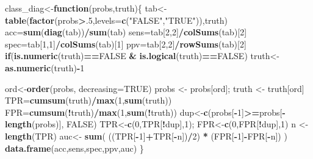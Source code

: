 \documentclass[]{article}
\newenvironment{Shaded}{\begin{snugshade}}{\end{snugshade}}
\newcommand{\ControlFlowTok}[1]{\textcolor[rgb]{0.13,0.29,0.53}{\textbf{#1}}}
\newcommand{\DataTypeTok}[1]{\textcolor[rgb]{0.13,0.29,0.53}{#1}}
\newcommand{\DecValTok}[1]{\textcolor[rgb]{0.00,0.00,0.81}{#1}}
\newcommand{\KeywordTok}[1]{\textcolor[rgb]{0.13,0.29,0.53}{\textbf{#1}}}
\newcommand{\NormalTok}[1]{#1}
\newcommand{\OperatorTok}[1]{\textcolor[rgb]{0.81,0.36,0.00}{\textbf{#1}}}
\newcommand{\OtherTok}[1]{\textcolor[rgb]{0.56,0.35,0.01}{#1}}
\newcommand{\StringTok}[1]{\textcolor[rgb]{0.31,0.60,0.02}{#1}}
\begin{document}
\begin{Shaded}
\begin{Highlighting}[]
\NormalTok{class_diag<-}\ControlFlowTok{function}\NormalTok{(probs,truth)\{}
\NormalTok{ tab<-}\KeywordTok{table}\NormalTok{(}\KeywordTok{factor}\NormalTok{(probs}\OperatorTok{>}\NormalTok{.}\DecValTok{5}\NormalTok{,}\DataTypeTok{levels=}\KeywordTok{c}\NormalTok{(}\StringTok{"FALSE"}\NormalTok{,}\StringTok{"TRUE"}\NormalTok{)),truth)}
\NormalTok{ acc=}\KeywordTok{sum}\NormalTok{(}\KeywordTok{diag}\NormalTok{(tab))}\OperatorTok{/}\KeywordTok{sum}\NormalTok{(tab)}
\NormalTok{ sens=tab[}\DecValTok{2}\NormalTok{,}\DecValTok{2}\NormalTok{]}\OperatorTok{/}\KeywordTok{colSums}\NormalTok{(tab)[}\DecValTok{2}\NormalTok{]}
\NormalTok{ spec=tab[}\DecValTok{1}\NormalTok{,}\DecValTok{1}\NormalTok{]}\OperatorTok{/}\KeywordTok{colSums}\NormalTok{(tab)[}\DecValTok{1}\NormalTok{]}
\NormalTok{ ppv=tab[}\DecValTok{2}\NormalTok{,}\DecValTok{2}\NormalTok{]}\OperatorTok{/}\KeywordTok{rowSums}\NormalTok{(tab)[}\DecValTok{2}\NormalTok{]}
 \ControlFlowTok{if}\NormalTok{(}\KeywordTok{is.numeric}\NormalTok{(truth)}\OperatorTok{==}\OtherTok{FALSE} \OperatorTok{&}\StringTok{ }\KeywordTok{is.logical}\NormalTok{(truth)}\OperatorTok{==}\OtherTok{FALSE}\NormalTok{) truth<-}\KeywordTok{as.numeric}\NormalTok{(truth)}\OperatorTok{-}\DecValTok{1}
 
\NormalTok{ ord<-}\KeywordTok{order}\NormalTok{(probs, }\DataTypeTok{decreasing=}\OtherTok{TRUE}\NormalTok{)}
\NormalTok{ probs <-}\StringTok{ }\NormalTok{probs[ord]; truth <-}\StringTok{ }\NormalTok{truth[ord]}
\NormalTok{ TPR=}\KeywordTok{cumsum}\NormalTok{(truth)}\OperatorTok{/}\KeywordTok{max}\NormalTok{(}\DecValTok{1}\NormalTok{,}\KeywordTok{sum}\NormalTok{(truth))}
\NormalTok{ FPR=}\KeywordTok{cumsum}\NormalTok{(}\OperatorTok{!}\NormalTok{truth)}\OperatorTok{/}\KeywordTok{max}\NormalTok{(}\DecValTok{1}\NormalTok{,}\KeywordTok{sum}\NormalTok{(}\OperatorTok{!}\NormalTok{truth))}
\NormalTok{ dup<-}\KeywordTok{c}\NormalTok{(probs[}\OperatorTok{-}\DecValTok{1}\NormalTok{]}\OperatorTok{>=}\NormalTok{probs[}\OperatorTok{-}\KeywordTok{length}\NormalTok{(probs)], }\OtherTok{FALSE}\NormalTok{)}
\NormalTok{ TPR<-}\KeywordTok{c}\NormalTok{(}\DecValTok{0}\NormalTok{,TPR[}\OperatorTok{!}\NormalTok{dup],}\DecValTok{1}\NormalTok{); FPR<-}\KeywordTok{c}\NormalTok{(}\DecValTok{0}\NormalTok{,FPR[}\OperatorTok{!}\NormalTok{dup],}\DecValTok{1}\NormalTok{)}
\NormalTok{ n <-}\StringTok{ }\KeywordTok{length}\NormalTok{(TPR)}
\NormalTok{ auc<-}\StringTok{ }\KeywordTok{sum}\NormalTok{( ((TPR[}\OperatorTok{-}\DecValTok{1}\NormalTok{]}\OperatorTok{+}\NormalTok{TPR[}\OperatorTok{-}\NormalTok{n])}\OperatorTok{/}\DecValTok{2}\NormalTok{) }\OperatorTok{*}\StringTok{ }\NormalTok{(FPR[}\OperatorTok{-}\DecValTok{1}\NormalTok{]}\OperatorTok{-}\NormalTok{FPR[}\OperatorTok{-}\NormalTok{n]) )}
 \KeywordTok{data.frame}\NormalTok{(acc,sens,spec,ppv,auc)}
\NormalTok{\} }


\end{Highlighting}
\end{Shaded}
\end{document}
